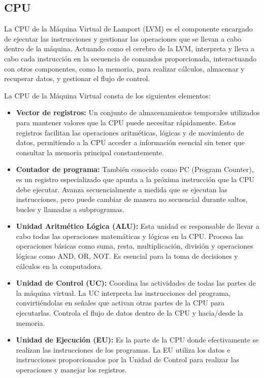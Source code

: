 \subsection{CPU}\label{subsubsec:CPULVM}
La CPU de la Máquina Virtual de Lamport (LVM) es el componente encargado de ejecutar las instrucciones y gestionar las operaciones que se llevan a cabo dentro de la máquina. Actuando como el cerebro de la LVM, interpreta y lleva a cabo cada instrucción en la secuencia de comandos proporcionada, interactuando con otros componentes, como la memoria, para realizar cálculos, almacenar y recuperar datos, y gestionar el flujo de control.



\noindent
La CPU de la Máquina Virtual consta de los siguientes elementos:
\begin{itemize}
    \item \textbf{Vector de registros:} Un conjunto de almacenamientos temporales utilizados para mantener valores que la CPU puede necesitar rápidamente. Estos registros facilitan las operaciones aritméticas, lógicas y de movimiento de datos, permitiendo a la CPU acceder a información esencial sin tener que consultar la memoria principal constantemente.
    
    \item \textbf{Contador de programa:} También conocido como PC (Program Counter), es un registro especializado que apunta a la próxima instrucción que la CPU debe ejecutar. Avanza secuencialmente a medida que se ejecutan las instrucciones, pero puede cambiar de manera no secuencial durante saltos, bucles y llamadas a subprogramas.
    
    \item \textbf{Unidad Aritmético Lógica (ALU):} Esta unidad es responsable de llevar a cabo todas las operaciones matemáticas y lógicas en la CPU. Procesa las operaciones básicas como suma, resta, multiplicación, división y operaciones lógicas como AND, OR, NOT. Es esencial para la toma de decisiones y cálculos en la computadora.

    \item \textbf{Unidad de Control (UC):} Coordina las actividades de todas las partes de la máquina virtual. La UC interpreta las instrucciones del programa, convirtiéndolas en señales que activan otras partes de la CPU para ejecutarlas. Controla el flujo de datos dentro de la CPU y hacia/desde la memoria.

    \item \textbf{Unidad de Ejecución (EU):} Es la parte de la CPU donde efectivamente se realizan las instrucciones de los programas. La EU utiliza los datos e instrucciones proporcionados por la Unidad de Control para realizar las operaciones y manejar los registros.
\end{itemize}


